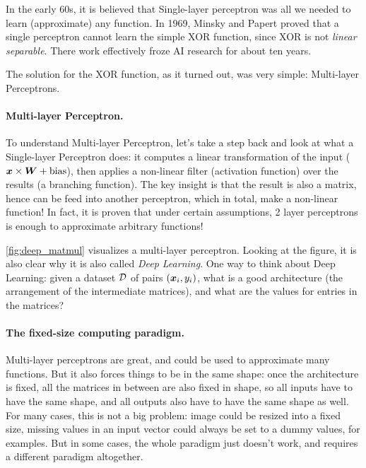 In the early 60s, it is believed that Single-layer perceptron was all we needed to learn
(approximate) any function. In 1969, Minsky and Papert \cite{perceptrons} proved
that a single perceptron cannot learn the simple XOR function, since XOR is not
\emph{linear separable}. There work effectively froze AI research for about ten years.

The solution for the XOR function, as it turned out, was very simple:
Multi-layer Perceptrons.

\paragraph{Multi-layer Perceptron.} To understand Multi-layer Perceptron, let's
take a step back and look at what a Single-layer Perceptron does: it computes a linear
transformation of the input ($\boldsymbol{x} \times \boldsymbol{W} + \text{bias}$), then
applies a non-linear filter (activation function) over the results (a branching function). The key
insight is that the result is also a matrix, hence can be feed into another
perceptron, which in total, make a non-linear function! In fact, it is proven \cite{universal}
that under certain assumptions, 2 layer perceptrons is enough to approximate arbitrary
functions!

\cref{fig:deep_matmul} visualizes a multi-layer perceptron. Looking at the
figure, it is also clear why it is also called \emph{Deep Learning}. One way to
think about Deep Learning: given a dataset $\mathcal{D}$ of pairs $(\boldsymbol{x}_i, y_i)$, what
is a good architecture (the arrangement of the intermediate matrices), and what are
the values for entries in the matrices?

\paragraph{The fixed-size computing paradigm.} Multi-layer perceptrons are
great, and could be used to approximate many functions. But it also forces
things to be in the same shape: once the architecture is fixed, all the matrices
in between are also fixed in shape, so all inputs have to have the same shape,
and all outputs also have to have the same shape as well. For many cases, this
is not a big problem: image could be resized into a fixed size, missing
values in an input vector could always be set to a dummy values, for examples.
But in some cases, the whole paradigm just doesn't work, and requires a
different paradigm altogether. 


